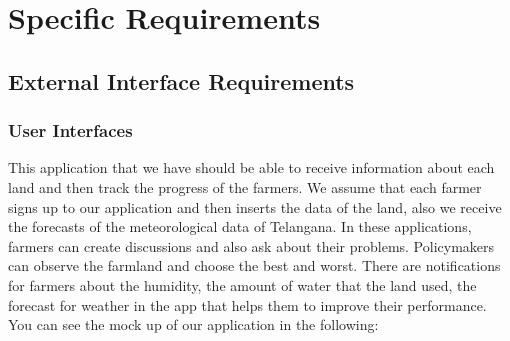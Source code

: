 \section{Specific Requirements}
\subsection{External Interface Requirements}
    \subsubsection{User Interfaces}
    This application that we have should be able to receive information about each land and then track the progress of the farmers. We assume that each farmer signs up to our application and then inserts the data of the land, also we receive the forecasts of the meteorological data of Telangana. In these applications, farmers can create discussions and also ask about their problems. Policymakers can observe the farmland and choose the best and worst. There are notifications for farmers about the humidity, the amount of water that the land used, the forecast for weather in the app that helps them to improve their performance. You can see the mock up of our application in the following:
    
